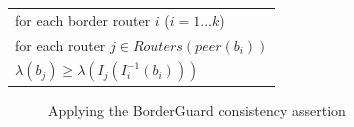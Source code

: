 \vspace{0.05in}
\begin{center}
\begin{tabular}{|l|}
\hline
for each border router $i$ \hspace*{0.15in} ($i = 1\ldots k$) \\
\hspace*{0.2in} for each router $j\in Routers(peer(b_i))$ \\
\hspace*{0.4in}    $\lambda(b_j) \geq \lambda(I_j(I^{-1}_i(b_i)))$ \\
\hline
\end{tabular}
\end{center}
\vspace{0.05in}

\begin{figure}
\begin{center}
\begin{psfrags}
\end{psfrags}
\end{center}
\caption{Applying the BorderGuard consistency assertion}
\label{fig:invariant}
\end{figure}


